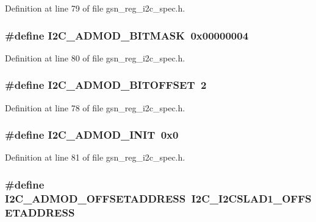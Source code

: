 Definition at line 79 of file gsn\_\-reg\_\-i2c\_\-spec.h.

\hypertarget{a00558_ae33b3604e87610271228bfe4e2e17f51}{
\subsubsection[{I2C\_\-ADMOD\_\-BITMASK}]{\setlength{\rightskip}{0pt plus 5cm}\#define I2C\_\-ADMOD\_\-BITMASK~0x00000004}}
\label{a00558_ae33b3604e87610271228bfe4e2e17f51}


Definition at line 80 of file gsn\_\-reg\_\-i2c\_\-spec.h.

\hypertarget{a00558_ad465e667f372d3abb491c85bf2de61fc}{
\subsubsection[{I2C\_\-ADMOD\_\-BITOFFSET}]{\setlength{\rightskip}{0pt plus 5cm}\#define I2C\_\-ADMOD\_\-BITOFFSET~2}}
\label{a00558_ad465e667f372d3abb491c85bf2de61fc}


Definition at line 78 of file gsn\_\-reg\_\-i2c\_\-spec.h.

\hypertarget{a00558_add5821383f488bbee780c322033f1930}{
\subsubsection[{I2C\_\-ADMOD\_\-INIT}]{\setlength{\rightskip}{0pt plus 5cm}\#define I2C\_\-ADMOD\_\-INIT~0x0}}
\label{a00558_add5821383f488bbee780c322033f1930}


Definition at line 81 of file gsn\_\-reg\_\-i2c\_\-spec.h.

\hypertarget{a00558_a075d33d29fac97a63794946ac5dc468e}{
\subsubsection[{I2C\_\-ADMOD\_\-OFFSETADDRESS}]{\setlength{\rightskip}{0pt plus 5cm}\#define I2C\_\-ADMOD\_\-OFFSETADDRESS~I2C\_\-I2CSLAD1\_\-OFFSETADDRESS}}
\label{a00558_a075d33d29fac97a63794946ac5dc468e}


